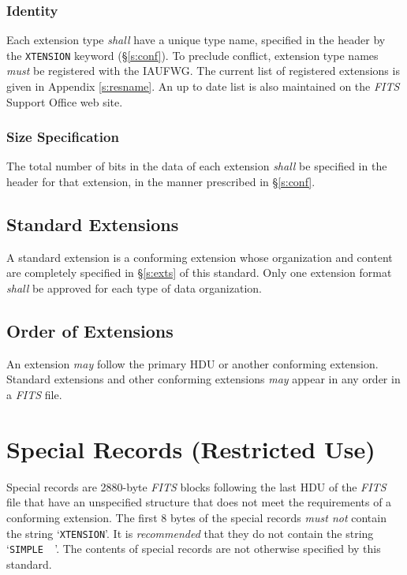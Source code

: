 \documentclass[11pt,makeidx]{book}     %
\begin{document}
   \subsubsection{Identity}
   \label{s:idy}
   Each extension
   type 
   {\em shall} have a unique type name, 
   specified in the
   header by the {\tt XTENSION} keyword (\S\ref{s:conf}).
   To preclude conflict, extension type names {\em must} be 
   registered
   with the IAUFWG\@.  The current list of
   registered extensions is given in Appendix \ref{s:resname}.
   An up to date list is also maintained on the {\em FITS\/} 
   Support Office web site.
  
   \subsubsection{Size Specification}
   The total number of bits in the data of each extension
   {\em shall} be specified in the header for that extension, in the
   manner prescribed in \S\ref{s:conf}.
  
   \subsection{Standard Extensions}
   A standard 
   extension is a 
   conforming
   extension whose
   organization and content are completely specified in  
   \S\ref{s:exts} of this standard.
   Only one extension format
   {\em shall} be approved for each type of data organization.  
  
   \subsection{Order of Extensions}
   An extension {\em may} follow the primary HDU  
   or another conforming
   extension. 
   Standard 
   extensions 
   and other conforming extensions {\em may} appear 
   in any order
   in a {\em FITS\/} file.
  
  \section{Special Records (Restricted Use)}
   Special records are 2880-byte {\em FITS\/} blocks following the last HDU
   of the {\em FITS\/} file that have an unspecified structure that does not
   meet the requirements of a conforming extension. The first 8
   bytes of the special records {\em must not} contain the
   string `\verb+XTENSION+'.  It is {\em recommended} that they
   do not contain the string  
   `\verb*+SIMPLE  +'. The contents of special records are not otherwise 
   specified by this standard.  
\end{document}
